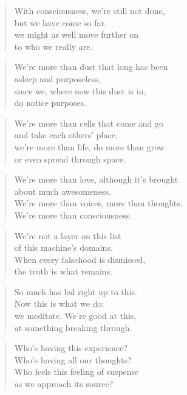 \documentclass[10pt,a4paper]{article}
\begin{document}
\begin{paracol}{2}
\begin{verse}
With consciousness, we’re still not done,\\
but we have come so far,\\
we might as well move further on\\
to who we really are.
\end{verse}

\begin{verse}
We’re more than dust that long has been\\
asleep and purposeless,\\
since we, where now this dust is in,\\
do notice purposes.
\end{verse}

\begin{verse}
We’re more than cells that come and go\\
and take each others’ place,\\
we’re more than life, do more than grow\\
or even spread through space.
\end{verse}

\begin{verse}
We’re more than love, although it’s brought\\
about much awesomeness.\\
We’re more than voices, more than thoughts.\\
We’re more than consciousness.
\end{verse}

\begin{verse}
We’re not a layer on this list\\
of this machine’s domains.\\
When every falsehood is dismissed,\\
the truth is what remains.
\end{verse}

\begin{verse}
So much has led right up to this.\\
Now this is what we do:\\
we meditate. We’re good at this,\\
at something breaking through.
\end{verse}

\begin{verse}
Who’s having this experience?\\
Who’s having all our thoughts?\\
Who feels this feeling of suspense\\
as we approach its source?
\end{verse}


\end{paracol}
\end{document}
